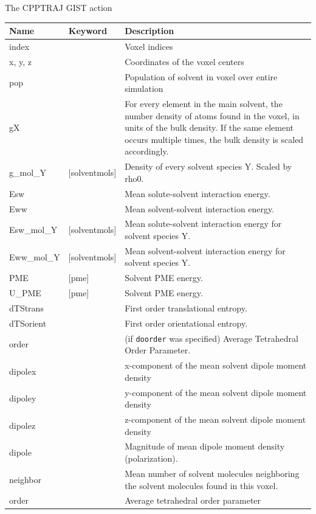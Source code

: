 \documentclass[9pt,tutorial]{livecoms}
\newcommand\inlinecode{\texttt}
\begin{document}
\begin{Checklists*}[h!]
\begin{checklist}{The CPPTRAJ GIST action}
\begin{tabularx}{\textwidth}{@{}l l X@{}}
\toprule
Name & Keyword & Description\\
\midrule
index & & Voxel indices \\
x, y, z & & Coordinates of the voxel centers \\
pop & & Population of solvent in voxel over entire simulation \\
gX &  & For every element in the main solvent, the number density of atoms found in the voxel, in units of the bulk density. If the same element occurs multiple times, the bulk density is scaled accordingly. \\
g\_mol\_Y & [solventmols]  & Density of every solvent species Y. Scaled by rho0. \\
Esw &  &  Mean solute-solvent interaction energy. \\
Eww &  & Mean solvent-solvent interaction energy. \\
Esw\_mol\_Y & [solventmols]  &  Mean solute-solvent interaction energy for solvent species Y. \\
Eww\_mol\_Y & [solventmols]  & Mean solvent-solvent interaction energy for solvent species Y. \\
PME & [pme] & Solvent PME energy. \\
U\_PME & [pme] & Solvent PME energy. \\
dTStrans &  & First order translational entropy. \\
dTSorient &  & First order orientational entropy. \\
order &  & (if \inlinecode{doorder} was specified) Average Tetrahedral Order Parameter. \\
dipolex &  & x-component of the mean solvent dipole moment density \\
dipoley &  & y-component of the mean solvent dipole moment density \\
dipolez &  & z-component of the mean solvent dipole moment density \\
dipole &  & Magnitude of mean dipole moment density (polarization). \\
neighbor &  & Mean number of solvent molecules neighboring the solvent molecules found in this voxel. \\
order & & Average tetrahedral order parameter \\

\end{tabularx}
\end{checklist}
\end{Checklists*}
\FloatBarrier
\end{document}
